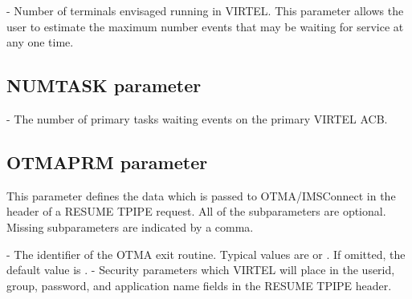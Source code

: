 \documentclass[letterpaper,10pt,english]{sphinxmanual}
\begin{document}
 - Number of terminals envisaged running in VIRTEL. This parameter allows the user to estimate the maximum number events that may be waiting for service at any one time.


\subsection{NUMTASK parameter}
\label{\detokenize{Installation_Guide:index-95}}\label{\detokenize{Installation_Guide:numtask-parameter}}
\begin{sphinxVerbatim}[commandchars=\\\{\}]
 
\end{sphinxVerbatim}

 - The number of primary tasks waiting events on the primary VIRTEL ACB.


\subsection{OTMAPRM parameter}
\label{\detokenize{Installation_Guide:index-96}}\label{\detokenize{Installation_Guide:otmaprm-parameter}}
\begin{sphinxVerbatim}[commandchars=\\\{\}]
 
\end{sphinxVerbatim}

This parameter defines the data which is passed to OTMA/IMSConnect in the header of a RESUME TPIPE request. All of the subparameters are optional. Missing subparameters are indicated by a comma.

 - The identifier of the OTMA exit routine. Typical values are  or . If omitted, the default value is .
 - Security parameters which VIRTEL will place in the userid, group, password, and application name fields in the RESUME TPIPE header.
\end{document}
